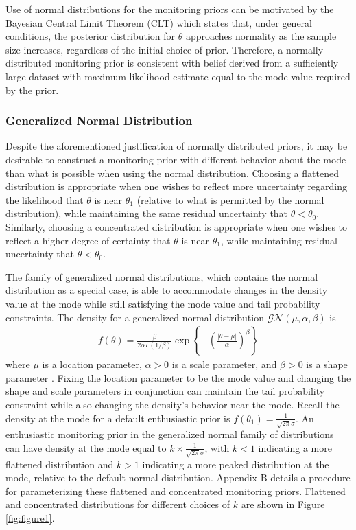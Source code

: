 \documentclass[12pt]{article}
\begin{document}
Use of normal distributions for the monitoring priors can be motivated by the Bayesian Central Limit Theorem (CLT) \citep{LeCam2000} which states that, under general conditions, the posterior distribution for $\theta$ approaches normality as the sample size increases, regardless of the initial choice of prior.
%
Therefore, a normally distributed monitoring prior is consistent with belief derived from a sufficiently large dataset with maximum likelihood estimate equal to the mode value required by the prior.

\subsubsection{Generalized Normal Distribution}\label{sec:gen_normal}
Despite the aforementioned justification of normally distributed priors, it may be desirable to construct a monitoring prior with different behavior about the  mode than what is possible when using the normal distribution. 
%
Choosing a flattened distribution is appropriate {when one wishes to reflect more uncertainty regarding the likelihood that 
$\theta$ is near $\theta_1$ (relative to what is permitted by the normal distribution), while maintaining the same residual uncertainty 
that $\theta<\theta_0$}. 
%
Similarly, choosing a concentrated distribution is appropriate {when one wishes to reflect} a higher 
degree of certainty that $\theta$ is near $\theta_1$, while maintaining residual uncertainty that $\theta<\theta_0$. 
%

The family of generalized normal distributions, which contains the normal distribution as a special case, is able to accommodate changes in the density value at the mode while still satisfying the mode value and tail probability constraints. 
%
The density for a generalized normal distribution $\mathcal{GN}(\mu,\alpha,\beta)$ is
\begin{align*}
f(\theta)=\frac{\beta}{2\alpha\Gamma(1/\beta)}\exp\left\{-\left(\frac{|\theta-\mu|}{\alpha}\right)^\beta\right\}
\end{align*} where $\mu$ is a location parameter, $\alpha>0$ is a scale parameter, and $\beta>0$ is a shape parameter \citep{Nadarajah2005}. Fixing the location parameter to be the mode value and changing the shape and scale parameters in conjunction can maintain the tail probability constraint while also changing the density's behavior near the mode. 
%
Recall the density at the mode for a default enthusiastic prior is $f(\theta_1)=\frac{1}{\sqrt{2\pi}\sigma}$. 
%
An enthusiastic monitoring prior in the generalized normal family of distributions can have density at the mode equal to $k\times \frac{1}{\sqrt{2\pi}\sigma}$, with $k<1$ indicating a more flattened distribution and $k>1$ indicating a more peaked distribution at the mode, relative to the default normal distribution. 
%
Appendix B details a procedure for parameterizing these flattened and concentrated monitoring priors. 
%
Flattened and concentrated distributions for different choices of $k$ are shown in Figure \ref{fig:figure1}. 
\end{document}
